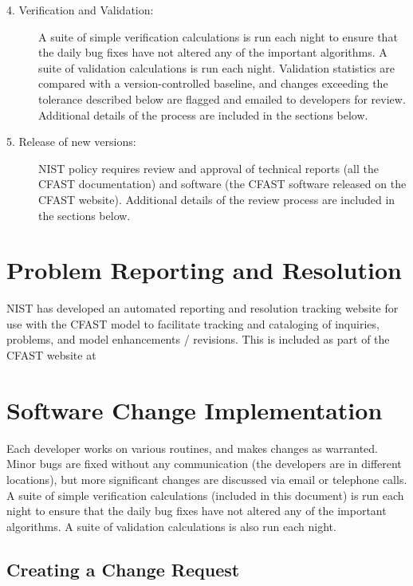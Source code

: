 \documentclass[12pt]{book}
\begin{document}
\begin{description}
    \item [4. Verification and Validation:] A suite of simple verification calculations is run each night to ensure that the daily bug fixes have not altered any of the important algorithms. A suite of validation calculations is run each night. Validation statistics are compared with a version-controlled baseline, and changes exceeding the tolerance described below are flagged and emailed to developers for review. Additional details of the process are included in the sections below.
    \item [5. Release of new versions:] NIST policy requires review and approval of technical reports (all the CFAST documentation) and software (the CFAST software released on the CFAST website). Additional details of the review process are included in the sections below.
\end{description}

\section{Problem Reporting and Resolution}

NIST has developed an automated reporting and resolution tracking website for use with the CFAST model to facilitate tracking and cataloging of inquiries, problems, and model enhancements / revisions. This is included as part of the CFAST website at \newline
\href{https://github.com/firemodels/cfast/issues}{}

\section{Software Change Implementation}

Each developer works on various routines, and makes changes as warranted. Minor bugs are fixed without any communication (the developers are in different locations), but more significant changes are discussed via email or telephone calls. A suite of simple verification calculations (included in this document) is run each night to ensure that the daily bug fixes have not altered any of the important algorithms. A suite of validation calculations is also run each night.

\subsection{Creating a Change Request}
\end{document}
